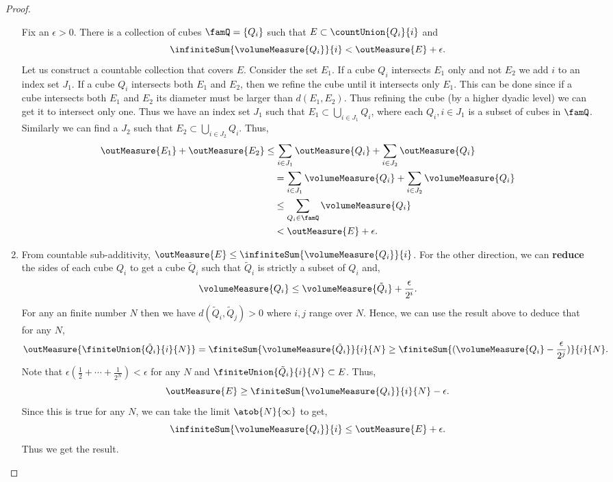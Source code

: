 \begin{proof}
\begin{enumerate}
	    Fix an $\epsilon > 0$. There is a collection of cubes $\famQ = \lbrace Q_i \rbrace$ such that 
	    $E \subset
	    \countUnion{Q_i}{i}$ and
	    \[\infiniteSum{\volumeMeasure{Q_i}}{i} < \outMeasure{E} + \epsilon.\]
	    Let us construct a countable collection that covers $E$. 
	    Consider the set $E_1$. If a cube $Q_i$ intersects $E_1$ only
	    and not $E_2$ we add $i$ to an index set $J_1$. If a cube $Q_i$ intersects both $E_1$ and $E_2$, 
	    then we
	    refine the cube until it intersects only $E_1$. This can be done since if a cube intersects both 
	    $E_1$ and
	    $E_2$ its diameter must be larger than $d(E_1,E_2)$. Thus refining the cube (by a higher dyadic 
	    level)
	    we can get it to intersect only one. Thus we have an index set $J_1$ such that $E_1 \subset
	    \bigcup\limits_{i\in J_1}{Q_i}$, where each $Q_i, i\in J_1$ is a subset of cubes in $\famQ$. 
	    Similarly
	    we can find a $J_2$ such that $E_2 \subset \bigcup\limits_{i\in J_2}{Q_i}$. Thus,
	    \begin{align*}
		\outMeasure{E_1} + \outMeasure{E_2} &\leq \sum\limits_{i\in J_1}\outMeasure{Q_i} +
		\sum\limits_{i\in J_2}\outMeasure{Q_i} \\
		& \quad = \sum\limits_{i\in J_1}\volumeMeasure{Q_i} +
		\sum\limits_{i\in J_2}\volumeMeasure{Q_i} \\
		&\quad \leq \sum\limits_{Q_i\in\famQ}{\volumeMeasure{Q_i}} \\
		&\quad < \outMeasure{E} + \epsilon.
	    \end{align*}
	\item
	    From countable sub-additivity, $\outMeasure{E} \leq \infiniteSum{\volumeMeasure{Q_i}}{i}$. For the
	    other direction, we can \textbf{reduce} the sides of each cube $Q_i$ to get a cube $\tilde{Q}_i$
	    such that $\tilde{Q}_i$ is strictly a subset of $Q_i$ and,
	    \[\volumeMeasure{Q_i} \leq \volumeMeasure{\tilde{Q}_i} + \frac{\epsilon}{2^i}.\]
	    For any an finite number $N$ then we have
	    $d(\tilde{Q}_i,\tilde{Q}_j) > 0$ where $i,j$ range over $N$. Hence, we can use the result above to
	    deduce that for any $N$,
	    \[\outMeasure{\finiteUnion{\tilde{Q}_i}{i}{N}} = \finiteSum{\volumeMeasure{\tilde{Q}_i}}{i}{N} \geq
		\finiteSum{(\volumeMeasure{Q_i}- \frac{\epsilon}{2^j})}{i}{N}.\]
	    Note that $\epsilon(\frac{1}{2} + \cdots + \frac{1}{2^N}) < \epsilon$ for any $N$ and
	    $\finiteUnion{\tilde{Q}_i}{i}{N} \subset E$. Thus,
	    \[\outMeasure{E} \geq \finiteSum{\volumeMeasure{Q_i}}{i}{N} - \epsilon. \]
	    Since this is true for any $N$, we can take the limit $\atob{N}{\infty}$ to get,
	    \[\infiniteSum{\volumeMeasure{Q_i}}{i} \leq \outMeasure{E} + \epsilon.\]
	    Thus we get the result.
    \end{enumerate}
\end{proof}

